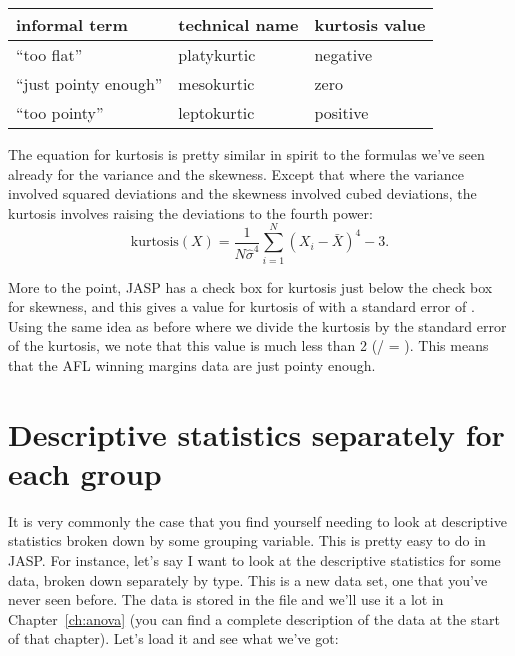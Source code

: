 \begin{center}
\begin{tabular}{lll}
informal term & technical name & kurtosis value \\ \hline
``too flat'' & platykurtic & negative \\
``just pointy enough'' & mesokurtic & zero \\
``too pointy'' & leptokurtic & positive 
\end{tabular}
\end{center}

\vspace{0.5cm}
\begin{mdframed}[style=MyFrame,nobreak=true]
The equation for kurtosis is pretty similar in spirit to the formulas we've seen already for the variance and the skewness. Except that where the variance involved squared deviations and the skewness involved cubed deviations, the kurtosis involves raising the deviations to the fourth power:
$$
\mbox{kurtosis}(X) = \frac{1}{N \hat\sigma^4} \sum_{i=1}^N \left( X_i - \bar{X} \right)^4  - 3.
$$

\end{mdframed}

More to the point, JASP has a check box for kurtosis just below the check box for skewness, and this gives a value for kurtosis of  with a standard error of . Using the same idea as before where we divide the kurtosis by the standard error of the kurtosis, we note that this value is much less than 2 (/ = ). This means that the AFL winning margins data are just pointy enough.


\section{Descriptive statistics separately for each group~\label{sec:groupdescriptives}}

It is very commonly the case that you find yourself needing to look at descriptive statistics broken down by some grouping variable. This is pretty easy to do in JASP. For instance, let's say I want to look at the descriptive statistics for some  data, broken down separately by  type. This is a new data set, one that you've never seen before. The data is stored in the  file and we'll use it a lot in Chapter~\ref{ch:anova} (you can find a complete description of the data at the start of that chapter). Let's load it and see what we've got:

